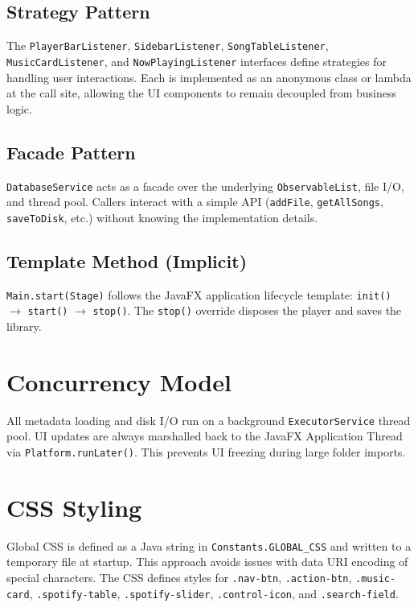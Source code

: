 ﻿\documentclass[12pt]{report}
\begin{document}
\subsection{Strategy Pattern}
The \texttt{PlayerBarListener}, \texttt{SidebarListener}, \texttt{SongTableListener}, \texttt{MusicCardListener}, and \texttt{NowPlayingListener} interfaces define strategies for handling user interactions. Each is implemented as an anonymous class or lambda at the call site, allowing the UI components to remain decoupled from business logic.

\subsection{Facade Pattern}
\texttt{DatabaseService} acts as a facade over the underlying \texttt{ObservableList}, file I/O, and thread pool. Callers interact with a simple API (\texttt{addFile}, \texttt{getAllSongs}, \texttt{saveToDisk}, etc.) without knowing the implementation details.

\subsection{Template Method (Implicit)}
\texttt{Main.start(Stage)} follows the JavaFX application lifecycle template: \texttt{init()} $\rightarrow$ \texttt{start()} $\rightarrow$ \texttt{stop()}. The \texttt{stop()} override disposes the player and saves the library.

\section{Concurrency Model}
All metadata loading and disk I/O run on a background \texttt{ExecutorService} thread pool. UI updates are always marshalled back to the JavaFX Application Thread via \texttt{Platform.runLater()}. This prevents UI freezing during large folder imports.

\section{CSS Styling}
Global CSS is defined as a Java string in \texttt{Constants.GLOBAL\_CSS} and written to a temporary file at startup. This approach avoids issues with data URI encoding of special characters. The CSS defines styles for \texttt{.nav-btn}, \texttt{.action-btn}, \texttt{.music-card}, \texttt{.spotify-table}, \texttt{.spotify-slider}, \texttt{.control-icon}, and \texttt{.search-field}.
\end{document}
